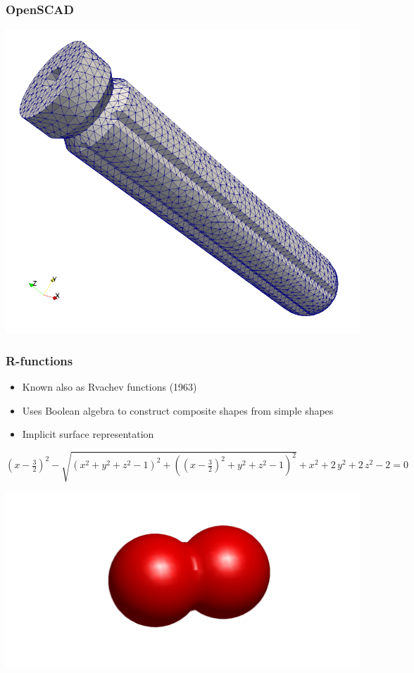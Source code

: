 \documentclass{beamer}
\begin{document}
\begin{frame}
\frametitle{OpenSCAD} 
\centerline{\includegraphics[scale = 0.3]{./figs/sdh_mesh}} 
\end{frame}

\begin{frame}[t] 
\frametitle{R-functions} 
\begin{itemize} 
\item Known also as Rvachev functions (1963) 
\item Uses Boolean algebra to construct composite shapes from simple shapes 
\item Implicit surface representation 
\end{itemize} 
${\left(x-\frac{3}{2}\right)}^2-\sqrt{{\left(x^2+y^2+z^2-1\right)}^2+{\left({\left(x-\frac{3}{2}\right)}^2+y^2+z^2-1\right)}^2}+x^2+2\,y^2+2\,z^2-2 = 0$ 
\centerline{\includegraphics[width = 0.75\linewidth]{./figs/TwoSpheres}} 
\end{frame} 
\end{document}
